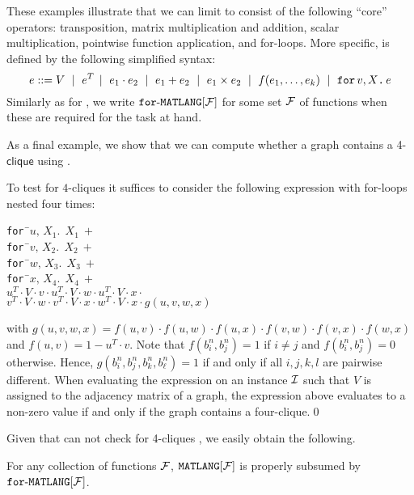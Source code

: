 These examples illustrate that we can limit \langfor to consist of the following ``core'' operators: transposition, matrix multiplication and addition, scalar multiplication, pointwise function application, and for-loops. More specific, \langfor is defined by the following simplified syntax:
$$
e ::= V \ \mid \ e^T \!\ \mid \ e_1 \cdot e_2 \ \mid \ e_1 + e_2 \ \mid \ e_1\times e_2  \ \mid \  f(e_1,\ldots ,e_k) \ \mid \ \texttt{for}\, v,X \texttt{.}\, e
$$
Similarly as for \lang, we write $\texttt{for}\text{-}\texttt{MATLANG}[\mathcal{F}]$ for some set $\mathcal{F}$ of functions when these are required for the task at hand.

As a final example, we show that we can compute whether a graph contains a 4-$\textsf{clique}$ using \langfor.
\begin{example}\label{ex:fourcliques}
To test for $4$-cliques it suffices to consider the following expression with for-loops nested four times:
\begin{tabbing}
\texttt{for\,}\=$u,\,X_1.\ \ X_1 \ + $\\
\> \texttt{for\,}\=$v,\,X_2.\ \ X_2 \ +$ \\
\>\>\texttt{for\,}\=$w,\,X_3.\ \ X_3 \ +$ \\
\>\>\>\texttt{for\,}\=$x,\,X_4.\ \ X_4 \ +$ \\
\>\>\>\>$u^T\cdot V\cdot v \cdot u^T\cdot V\cdot w\cdot u^T\cdot V\cdot x \cdot $\\
\>\>\>\>$v^T\cdot V\cdot w \cdot v^T\cdot V\cdot x\cdot w^T\cdot V\cdot x \cdot g(u,v,w,x)$
\end{tabbing}
with $g(u,v,w,x)=f(u,v)\cdot f(u,w)\cdot f(u,x)\cdot f(v,w)\cdot f(v,x)\cdot f(w,x)$ and
$f(u,v)=1-u^T\cdot v$. Note that $f(b_i^n,b_j^n)=1$ if $i\neq j$ and $f(b_i^n,b_j^n)=0$ otherwise.
Hence, $g(b_i^n,b_j^n,b_k^n,b_\ell^n)=1$ if and only if all $i,j,k,l$ are pairwise different.
When evaluating the expression on an instance $\mathcal{I}$ such that $V$ is assigned to the adjacency 
matrix of a graph, the expression above evaluates to a non-zero value if and only if the graph
contains a four-clique.\qed
\end{example}

Given that \lang can not check for 4-cliques \cite{matlang-journal}, we easily obtain the following.

\begin{proposition}
\label{cor-ml-fml}
For any collection of functions $\mathcal{F}$, 
$\texttt{MATLANG}[\mathcal{F}]$ is properly subsumed by $\texttt{for}\text{-}\texttt{MATLANG}[\mathcal{F}]$.
\end{proposition} 

